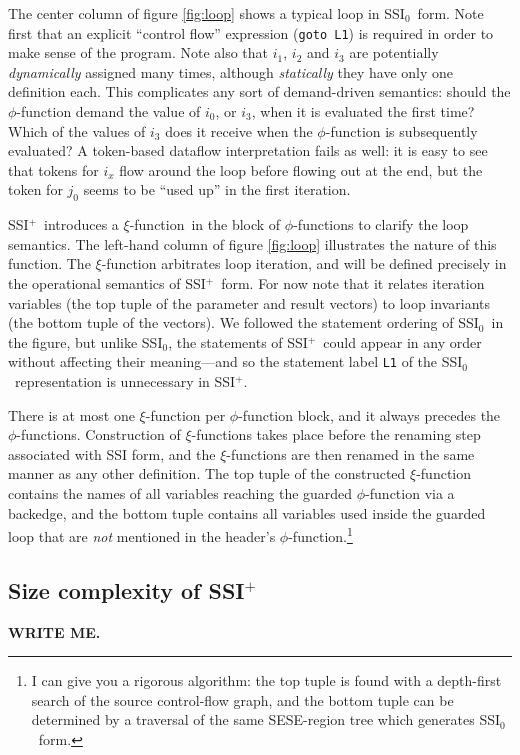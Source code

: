 \documentclass[12pt,notitlepage,twoside]{article}
\newcommand{\phifunction}{$\phi$-function}
\newcommand{\xifunction}{$\xi$-function}
\newcommand{\ssizero}{SSI$_0$}
\newcommand{\ssiplus}{SSI$^+$}
\begin{document}
The center column of figure \ref{fig:loop} shows a typical loop in
\ssizero\ form.  Note first that an explicit ``control flow''
expression (\texttt{goto L1}) is required in order to make sense of
the program.  Note also that $i_1$, $i_2$ and $i_3$ are potentially
\emph{dynamically} assigned many times, although \emph{statically}
they have only one definition each.  This complicates any sort of
demand-driven semantics: should the \phifunction{} demand the value of
$i_0$, or $i_3$, when it is evaluated the first time?  Which of the
values of $i_3$ does it receive when the \phifunction{} is
subsequently evaluated?  A token-based dataflow interpretation fails
as well: it is easy to see that tokens for $i_x$ flow around the loop
before flowing out at the end, but the token for $j_0$ seems to be
``used up'' in the first iteration.

\ssiplus\ introduces a \xifunction\ in the block of \phifunction{s} to
clarify the loop semantics. The left-hand column of figure
\ref{fig:loop} illustrates the nature of this function.  The
\xifunction{} arbitrates loop iteration, and will be defined precisely
in the operational semantics of \ssiplus\ form.  For now note that it
relates iteration variables (the top tuple of the parameter and result
vectors) to loop invariants (the bottom tuple of the vectors).  We
followed the statement ordering of \ssizero\ in the figure, but unlike
\ssizero, the statements of \ssiplus\ could appear in any order
without affecting their meaning---and so the statement label
\texttt{L1} of the \ssizero\ representation is unnecessary in \ssiplus.

There is at most one \xifunction{} per \phifunction{} block, and it
always precedes the \phifunction{s}.  Construction of \xifunction{s}
takes place before the renaming step associated with SSI form, and the
\xifunction{s} are then renamed in the same manner as any other
definition.  The top tuple of the constructed \xifunction{} contains
the names of all variables reaching the guarded \phifunction{} via a
backedge, and the bottom tuple contains all variables used inside the
guarded loop that are {\em not} mentioned in the header's
\phifunction{}.\footnote{I can give you a rigorous algorithm: the top
tuple is found with a depth-first search of the source
control-flow graph, and the bottom tuple can be determined by a
traversal of the same SESE-region tree which generates \ssizero\
form.}

\subsection{Size complexity of \ssiplus}
\textbf{WRITE ME.}
\end{document}

